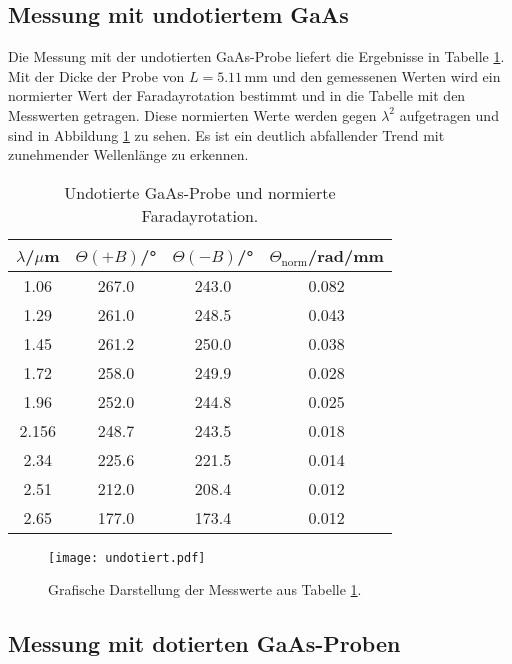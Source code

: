 \subsection{Messung mit undotiertem GaAs}
\label{sec:undotiert}

Die Messung mit der undotierten GaAs-Probe liefert die Ergebnisse in Tabelle \ref{tab:undot}.
Mit der Dicke der Probe von $L=5.11\,$mm und den gemessenen Werten wird ein normierter Wert der Faradayrotation bestimmt und in die Tabelle mit den Messwerten getragen.
Diese normierten Werte werden gegen $\lambda^2$ aufgetragen und sind in Abbildung \ref{abb:undot} zu sehen.
Es ist ein deutlich abfallender Trend mit zunehmender Wellenlänge zu erkennen.

\begin{table}
  \centering
  \caption{Undotierte GaAs-Probe und normierte Faradayrotation.}
  \label{tab:undot}
  \begin{tabular}{c | c | c | c}
    \toprule
    $\lambda$/$\mu$m & $\Theta(+B)$/° & $\Theta(-B)$/°& $\Theta_{\text{norm}}$/rad/mm \\
    \midrule
    1.06 & 267.0 & 243.0 & 0.082 \\
    1.29 & 261.0 & 248.5 & 0.043 \\
    1.45 & 261.2 & 250.0 & 0.038 \\
    1.72 & 258.0 & 249.9 & 0.028 \\
    1.96 & 252.0 & 244.8 & 0.025 \\
    2.156 & 248.7 & 243.5 & 0.018 \\
    2.34 & 225.6 & 221.5 & 0.014 \\
    2.51 & 212.0 & 208.4 & 0.012 \\
    2.65 & 177.0 & 173.4 & 0.012 \\
    \bottomrule
  \end{tabular}
\end{table}
\FloatBarrier

\begin{figure}
  \centering
  \texttt{[image: undotiert.pdf]}
  \caption{Grafische Darstellung der Messwerte aus Tabelle \ref{tab:undot}.}
  \label{abb:undot}
\end{figure}
\FloatBarrier

\subsection{Messung mit dotierten GaAs-Proben}
\label{sec:dot}

